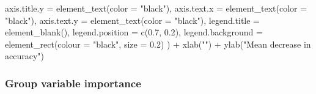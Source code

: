 \documentclass[
  11pt,
  oneside]{book}
\newenvironment{Shaded}{\begin{snugshade}}{\end{snugshade}}
\newcommand{\AttributeTok}[1]{\textcolor[rgb]{0.77,0.63,0.00}{#1}}
\newcommand{\FloatTok}[1]{\textcolor[rgb]{0.00,0.00,0.81}{#1}}
\newcommand{\FunctionTok}[1]{\textcolor[rgb]{0.00,0.00,0.00}{#1}}
\newcommand{\NormalTok}[1]{#1}
\newcommand{\SpecialCharTok}[1]{\textcolor[rgb]{0.00,0.00,0.00}{#1}}
\newcommand{\StringTok}[1]{\textcolor[rgb]{0.31,0.60,0.02}{#1}}
\begin{document}
\begin{Shaded}
\begin{Highlighting}[]
    \AttributeTok{axis.title.y =} \FunctionTok{element\_text}\NormalTok{(}\AttributeTok{color =} \StringTok{"black"}\NormalTok{),}
    \AttributeTok{axis.text.x =} \FunctionTok{element\_text}\NormalTok{(}\AttributeTok{color =} \StringTok{"black"}\NormalTok{),}
    \AttributeTok{axis.text.y =} \FunctionTok{element\_text}\NormalTok{(}\AttributeTok{color =} \StringTok{"black"}\NormalTok{),}
    \AttributeTok{legend.title =} \FunctionTok{element\_blank}\NormalTok{(),}
    \AttributeTok{legend.position =} \FunctionTok{c}\NormalTok{(}\FloatTok{0.7}\NormalTok{, }\FloatTok{0.2}\NormalTok{),}
    \AttributeTok{legend.background =} \FunctionTok{element\_rect}\NormalTok{(}\AttributeTok{colour =} \StringTok{"black"}\NormalTok{, }\AttributeTok{size =} \FloatTok{0.2}\NormalTok{)}
\NormalTok{  ) }\SpecialCharTok{+}
  \FunctionTok{xlab}\NormalTok{(}\StringTok{""}\NormalTok{) }\SpecialCharTok{+}
  \FunctionTok{ylab}\NormalTok{(}\StringTok{"Mean decrease in accuracy"}\NormalTok{)}
\end{Highlighting}
\end{Shaded}

\hypertarget{group-variable-importance}{%
\subsubsection{Group variable importance}\label{group-variable-importance}}
\end{document}
